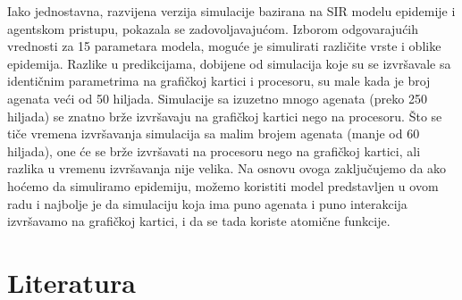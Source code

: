 Iako jednostavna, razvijena verzija simulacije bazirana na SIR modelu epidemije
i agentskom pristupu, pokazala se zadovoljavajućom. Izborom odgovarajućih vrednosti
za 15 parametara modela, moguće je simulirati različite vrste i oblike epidemija. Razlike
u predikcijama, dobijene od simulacija koje su se izvršavale sa identičnim parametrima
na grafičkoj kartici i procesoru, su male kada je broj agenata veći od 50 hiljada.
Simulacije sa izuzetno mnogo agenata (preko 250 hiljada) se znatno brže izvršavaju na
grafičkoj kartici nego na procesoru. Što se tiče vremena izvršavanja simulacija sa malim
brojem agenata (manje od 60 hiljada), one će se brže izvršavati na procesoru nego na
grafičkoj kartici, ali razlika u vremenu izvršavanja nije velika. Na osnovu ovoga
zaključujemo da ako hoćemo da simuliramo epidemiju, možemo koristiti model
predstavljen u ovom radu i najbolje je da simulaciju koja ima puno agenata i puno
interakcija izvršavamo na grafičkoj kartici, i da se tada koriste atomične funkcije.

\section{Literatura}

